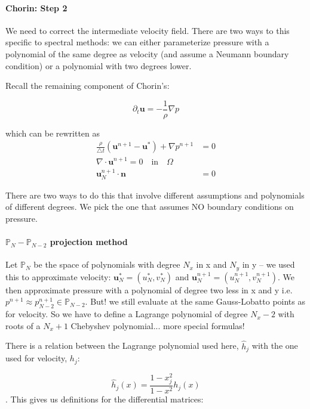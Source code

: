 \documentclass[12pt]{article}
\begin{document}
\paragraph{Chorin: Step 2} We need to correct the intermediate velocity field. There are two ways to this specific to spectral methods: we can either parameterize pressure with a polynomial of the same degree as velocity (and assume a Neumann boundary condition) or a polynomial with two degrees lower.

Recall the remaining component of Chorin's:

\begin{equation}
    \partial_t \mathbf{u} = -\frac{1}{\rho}\nabla p
\end{equation}

which can be rewritten as
\begin{align*}
    \frac{\rho}{\bigtriangleup t}(\mathbf{u}^{n+1} - \mathbf{u}^*) + \nabla p^{n+1} &= 0 \\
    \nabla \cdot \mathbf{u}^{n+1} = 0 \quad \text{in}\quad \Omega \\
    \mathbf{u}_N^{n+1} \cdot \mathbf{n} &= 0
\end{align*}

There are two ways to do this that involve different assumptions and polynomials of different degrees. We pick the one that assumes NO boundary conditions on pressure.

\paragraph{$\mathbb{P}_N - \mathbb{P}_{N-2}$ projection method}

Let $\mathbb{P}_N$ be the space of polynomials with degree $N_x$ in x and $N_y$ in y -- we used this to approximate velocity: $\mathbf{u}^{*}_N = (u_N^*, v_N^*)$ and $\mathbf{u}^{n+1}_N = (u_N^{n+1}, v_N^{n+1})$. We then approximate pressure with a polynomial of degree two less in x and y i.e. $p^{n+1} \approx p^{n+1}_{N-2} \in \mathbb{P}_{N-2}$. But! we still evaluate at the same Gauss-Lobatto points as for velocity. So we have to define a Lagrange polynomial of degree $N_x - 2$ with roots of a $N_x+1$ Chebyshev polynomial... more special formulas!

There is a relation between the Lagrange polynomial used here, $\hat{h}_j$ with the one used for velocity, $h_j$:

\begin{equation}
    \hat{h}_j(x) = \frac{1 - x_j^2}{1-x^2}h_j(x)
\end{equation}
. This gives us definitions for the differential matrices:
\end{document}
